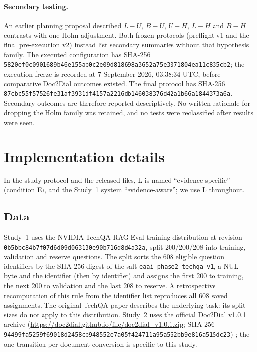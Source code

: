 \paragraph{Secondary testing.} An earlier planning proposal described $L-U$, $B-U$, $U-H$, $L-H$ and $B-H$ contrasts with one Holm adjustment. Both frozen protocols (preflight v1 and the final pre-execution v2) instead list secondary summaries without that hypothesis family. The executed configuration has SHA-256 \nolinkurl{5820ef0c0901689b46e155ab0c2e09d818698a3652a75e3071804ea11c835cb2}; the execution freeze is recorded at 7 September 2026, 03:38:34 UTC, before comparative Doc2Dial outcomes existed. The final protocol has SHA-256 \nolinkurl{87cbc55f57526fe31af3931df4157a2216db146038376d42a1b66a1844373a6a}. Secondary outcomes are therefore reported descriptively. No written rationale for dropping the Holm family was retained, and no tests were reclassified after results were seen.

\section{Implementation details}\label{supp:impl}
In the study protocol and the released files, L is named ``evidence-specific'' (condition E), and the Study~1 system ``evidence-aware''; we use L throughout.

\subsection{Data}
Study~1 uses the NVIDIA TechQA-RAG-Eval training distribution at revision \nolinkurl{0b5bbc84b7f07d6d09d063130e90b716d8d4a32a}, split 200/200/208 into training, validation and reserve questions. The split sorts the 608 eligible question identifiers by the SHA-256 digest of the salt \nolinkurl{eaai-phase2-techqa-v1}, a NUL byte and the identifier (then by identifier) and assigns the first 200 to training, the next 200 to validation and the last 208 to reserve. A retrospective recomputation of this rule from the identifier list reproduces all 608 saved assignments. The original TechQA paper \citep{castelli2020} describes the underlying task; its split sizes do not apply to this distribution. Study~2 uses the official Doc2Dial v1.0.1 archive (\url{https://doc2dial.github.io/file/doc2dial_v1.0.1.zip}; SHA-256 \nolinkurl{94499fa5259f69018d2458cb948552e7a05f424711a95a562bb9e816a515dc23}) \citep{feng2020}; the one-transition-per-document conversion is specific to this study.

